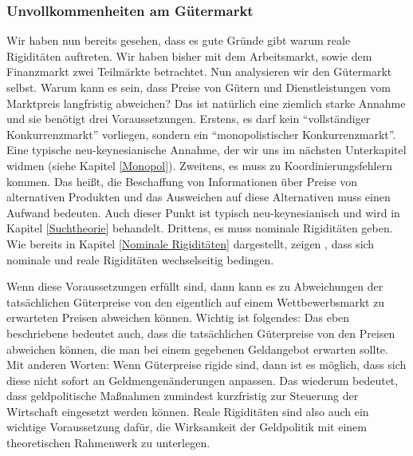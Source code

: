 \subsubsection{Unvollkommenheiten am Gütermarkt}
Wir haben nun bereits gesehen, dass es gute Gründe gibt warum reale Rigiditäten auftreten. Wir haben bisher mit dem Arbeitsmarkt, sowie dem Finanzmarkt zwei Teilmärkte betrachtet. Nun analysieren wir den Gütermarkt selbst. Warum kann es sein, dass Preise von Gütern und Dienstleistungen vom Marktpreis langfristig abweichen? Das ist natürlich eine ziemlich starke Annahme und sie benötigt drei Voraussetzungen. Erstens, es darf kein "`vollständiger Konkurrenzmarkt"' vorliegen, sondern ein "`monopolistischer Konkurrenzmarkt"'. Eine typische neu-keynesianische Annahme, der wir uns im nächsten Unterkapitel widmen (siehe Kapitel \ref{Monopol}). Zweitens, es muss zu Koordinierungsfehlern kommen. Das heißt, die Beschaffung von Informationen über Preise von alternativen Produkten und das Ausweichen auf diese Alternativen muss einen Aufwand bedeuten. Auch dieser Punkt ist typisch neu-keynesianisch und wird in Kapitel \ref{Suchtheorie} behandelt. Drittens, es muss nominale Rigiditäten geben. Wie bereits in Kapitel \ref{Nominale Rigiditäten} dargestellt, zeigen \textcite{RomerDavid1990}, dass sich nominale und reale Rigiditäten wechselseitig bedingen. 

Wenn diese Voraussetzungen erfüllt sind, dann kann es zu Abweichungen der tatsächlichen Güterpreise von den eigentlich auf einem Wettbewerbsmarkt zu erwarteten Preisen abweichen können. Wichtig ist folgendes: Das eben beschriebene bedeutet auch, dass die tatsächlichen Güterpreise von den Preisen abweichen können, die man bei einem gegebenen Geldangebot erwarten sollte. Mit anderen Worten: Wenn Güterpreise rigide sind, dann ist es möglich, dass sich diese nicht sofort an Geldmengenänderungen anpassen. Das wiederum bedeutet, dass geldpolitische Maßnahmen zumindest kurzfristig zur Steuerung der Wirtschaft eingesetzt werden können. Reale Rigiditäten sind also auch ein wichtige Voraussetzung dafür, die Wirksamkeit der Geldpolitik mit einem theoretischen Rahmenwerk zu unterlegen. 

